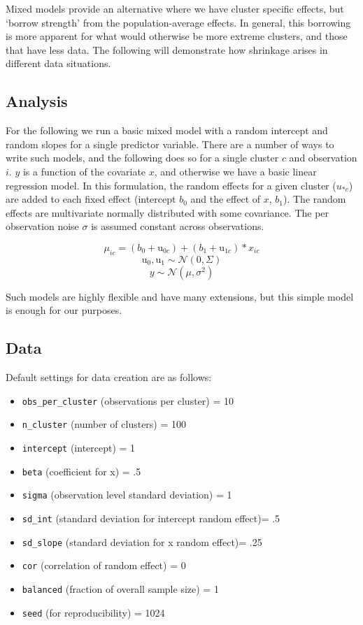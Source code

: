 \documentclass[
  12pt,
]{book}
\providecommand{\tightlist}{%
  \setlength{\itemsep}{0pt}\setlength{\parskip}{0pt}}
\begin{document}
Mixed models provide an alternative where we have cluster specific effects, but `borrow strength' from the population-average effects. In general, this borrowing is more apparent for what would otherwise be more extreme clusters, and those that have less data. The following will demonstrate how shrinkage arises in different data situations.

\hypertarget{analysis}{%
\subsection{Analysis}\label{analysis}}

For the following we run a basic mixed model with a random intercept and random slopes for a single predictor variable. There are a number of ways to write such models, and the following does so for a single cluster \(c\) and observation \(i\). \(y\) is a function of the covariate \(x\), and otherwise we have a basic linear regression model. In this formulation, the random effects for a given cluster (\(u_{* c}\)) are added to each fixed effect (intercept \(b_0\) and the effect of \(x\), \(b_1\)). The random effects are multivariate normally distributed with some covariance. The per observation noise \(\sigma\) is assumed constant across observations.

\[\mu_{ic} = (b_0 + \mathrm{u}_{0c})+ (b_1+\mathrm{u}_{1c}) * x_{ic}\]
\[\mathrm{u}_{0}, \mathrm{u}_{1} \sim \mathcal{N}(0, \Sigma)\]
\[y \sim \mathcal{N}(\mu, \sigma^2)\]

Such models are highly flexible and have many extensions, but this simple model is enough for our purposes.

\hypertarget{data}{%
\subsection{Data}\label{data}}

Default settings for data creation are as follows:

\begin{itemize}
\tightlist
\item
  \texttt{obs\_per\_cluster} (observations per cluster) = 10
\item
  \texttt{n\_cluster} (number of clusters) = 100
\item
  \texttt{intercept} (intercept) = 1
\item
  \texttt{beta} (coefficient for x) = .5
\item
  \texttt{sigma} (observation level standard deviation) = 1
\item
  \texttt{sd\_int} (standard deviation for intercept random effect)= .5
\item
  \texttt{sd\_slope} (standard deviation for x random effect)= .25
\item
  \texttt{cor} (correlation of random effect) = 0
\item
  \texttt{balanced} (fraction of overall sample size) = 1
\item
  \texttt{seed} (for reproducibility) = 1024
\end{itemize}
\end{document}

